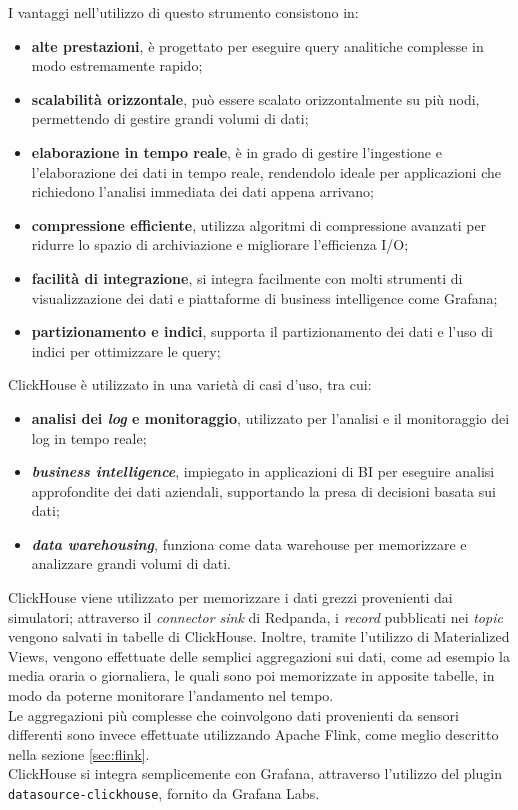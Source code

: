 I vantaggi nell'utilizzo di questo strumento consistono in:
\begin{itemize}
	\item \textbf{alte prestazioni}, è progettato per eseguire query analitiche complesse in modo estremamente rapido;
	\item \textbf{scalabilità orizzontale}, può essere scalato orizzontalmente su più nodi, permettendo di gestire grandi volumi di dati;
	\item \textbf{elaborazione in tempo reale}, è in grado di gestire l'ingestione e l'elaborazione dei dati in tempo reale, rendendolo ideale per applicazioni che richiedono l'analisi immediata dei dati appena arrivano;
	\item \textbf{compressione efficiente}, utilizza algoritmi di compressione avanzati per ridurre lo spazio di archiviazione e migliorare l'efficienza I/O;
	\item \textbf{facilità di integrazione}, si integra facilmente con molti strumenti di visualizzazione dei dati e piattaforme di business intelligence come Grafana;
	\item \textbf{partizionamento e indici}, supporta il partizionamento dei dati e l'uso di indici per ottimizzare le query;
\end{itemize}
ClickHouse è utilizzato in una varietà di casi d'uso, tra cui:
\begin{itemize}
	\item \textbf{analisi dei \textit{log} e monitoraggio}, utilizzato per l'analisi e il monitoraggio dei log in tempo reale;
	\item \textbf{\textit{business intelligence}}, impiegato in applicazioni di BI per eseguire analisi approfondite dei dati aziendali, supportando la presa di decisioni basata sui dati;
	\item \textbf{\textit{data warehousing}}, funziona come data warehouse per memorizzare e analizzare grandi volumi di dati.
\end{itemize}
ClickHouse viene utilizzato per memorizzare i dati grezzi provenienti dai simulatori; attraverso il \textit{connector sink} di Redpanda, i \textit{record} pubblicati nei \textit{topic} vengono
salvati in tabelle di ClickHouse.
Inoltre, tramite l'utilizzo di Materialized Views, vengono effettuate delle semplici aggregazioni sui dati, come ad esempio la media oraria o giornaliera, le quali sono poi memorizzate in apposite tabelle,
in modo da poterne monitorare l'andamento nel tempo.\\
Le aggregazioni più complesse che coinvolgono dati provenienti da sensori differenti sono invece effettuate utilizzando Apache Flink, come meglio descritto nella sezione \ref{sec:flink}.\\
ClickHouse si integra semplicemente con Grafana, attraverso l'utilizzo del plugin \\
\texttt{datasource-clickhouse}, fornito da Grafana Labs.

